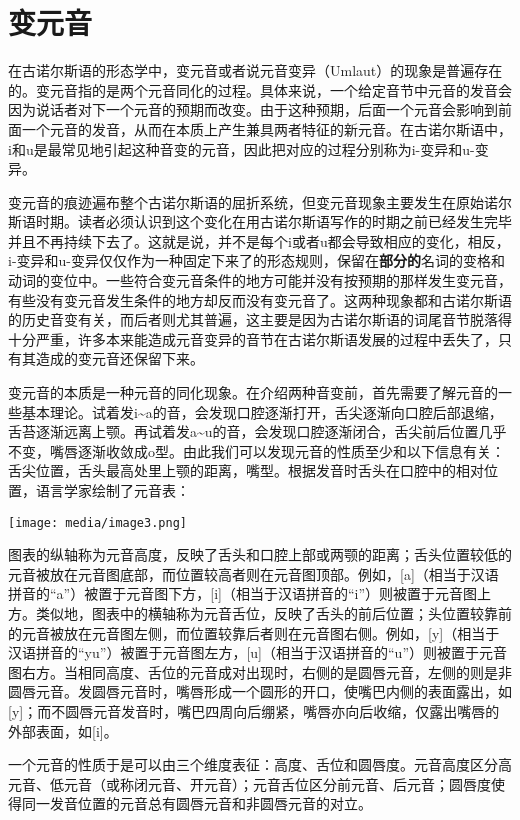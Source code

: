 \section{变元音}\label{变元音}

在古诺尔斯语的形态学中，变元音或者说元音变异（Umlaut）的现象是普遍存在的。变元音指的是两个元音同化的过程。具体来说，一个给定音节中元音的发音会因为说话者对下一个元音的预期而改变。由于这种预期，后面一个元音会影响到前面一个元音的发音，从而在本质上产生兼具两者特征的新元音。在古诺尔斯语中，i和u是最常见地引起这种音变的元音，因此把对应的过程分别称为i-变异和u-变异。

变元音的痕迹遍布整个古诺尔斯语的屈折系统，但变元音现象主要发生在原始诺尔斯语时期。读者必须认识到这个变化在用古诺尔斯语写作的时期之前已经发生完毕并且不再持续下去了。这就是说，并不是每个i或者u都会导致相应的变化，相反，i-变异和u-变异仅仅作为一种固定下来了的形态规则，保留在\textbf{部分的}名词的变格和动词的变位中。一些符合变元音条件的地方可能并没有按预期的那样发生变元音，有些没有变元音发生条件的地方却反而没有变元音了。这两种现象都和古诺尔斯语的历史音变有关，而后者则尤其普遍，这主要是因为古诺尔斯语的词尾音节脱落得十分严重，许多本来能造成元音变异的音节在古诺尔斯语发展的过程中丢失了，只有其造成的变元音还保留下来。

变元音的本质是一种元音的同化现象。在介绍两种音变前，首先需要了解元音的一些基本理论。试着发i\textasciitilde a的音，会发现口腔逐渐打开，舌尖逐渐向口腔后部退缩，舌苔逐渐远离上颚。再试着发a\textasciitilde u的音，会发现口腔逐渐闭合，舌尖前后位置几乎不变，嘴唇逐渐收敛成o型。由此我们可以发现元音的性质至少和以下信息有关：舌尖位置，舌头最高处里上颚的距离，嘴型。根据发音时舌头在口腔中的相对位置，语言学家绘制了元音表：

\texttt{[image: media/image3.png]}

图表的纵轴称为元音高度，反映了舌头和口腔上部或两颚的距离；舌头位置较低的元音被放在元音图底部，而位置较高者则在元音图顶部。例如，{[}a{]}（相当于汉语拼音的``a''）被置于元音图下方，{[}i{]}（相当于汉语拼音的``i''）则被置于元音图上方。类似地，图表中的横轴称为元音舌位，反映了舌头的前后位置；头位置较靠前的元音被放在元音图左侧，而位置较靠后者则在元音图右侧。例如，{[}y{]}（相当于汉语拼音的``yu''）被置于元音图左方，{[}u{]}（相当于汉语拼音的``u''）则被置于元音图右方。当相同高度、舌位的元音成对出现时，右侧的是圆唇元音，左侧的则是非圆唇元音。发圆唇元音时，嘴唇形成一个圆形的开口，使嘴巴内侧的表面露出，如{[}y{]}；而不圆唇元音发音时，嘴巴四周向后绷紧，嘴唇亦向后收缩，仅露出嘴唇的外部表面，如{[}i{]}。

一个元音的性质于是可以由三个维度表征：高度、舌位和圆唇度。元音高度区分高元音、低元音（或称闭元音、开元音）；元音舌位区分前元音、后元音；圆唇度使得同一发音位置的元音总有圆唇元音和非圆唇元音的对立。

